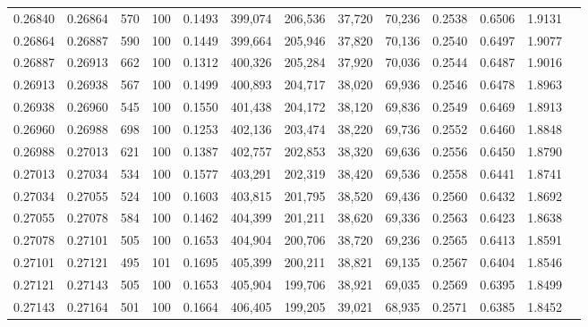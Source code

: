 \begin{tabular}{rrrrrrrrrrrrr}
0.26840 & 0.26864 &   570 & 100 &                                     0.1493 & 399,074 & 206,536 &  37,720 &  70,236 & 0.2538 & 0.6506 & 1.9131 \\
0.26864 & 0.26887 &   590 & 100 &                                     0.1449 & 399,664 & 205,946 &  37,820 &  70,136 & 0.2540 & 0.6497 & 1.9077 \\
0.26887 & 0.26913 &   662 & 100 &                                     0.1312 & 400,326 & 205,284 &  37,920 &  70,036 & 0.2544 & 0.6487 & 1.9016 \\
0.26913 & 0.26938 &   567 & 100 &                                     0.1499 & 400,893 & 204,717 &  38,020 &  69,936 & 0.2546 & 0.6478 & 1.8963 \\
0.26938 & 0.26960 &   545 & 100 &                                     0.1550 & 401,438 & 204,172 &  38,120 &  69,836 & 0.2549 & 0.6469 & 1.8913 \\
0.26960 & 0.26988 &   698 & 100 &                                     0.1253 & 402,136 & 203,474 &  38,220 &  69,736 & 0.2552 & 0.6460 & 1.8848 \\
0.26988 & 0.27013 &   621 & 100 &                                     0.1387 & 402,757 & 202,853 &  38,320 &  69,636 & 0.2556 & 0.6450 & 1.8790 \\
0.27013 & 0.27034 &   534 & 100 &                                     0.1577 & 403,291 & 202,319 &  38,420 &  69,536 & 0.2558 & 0.6441 & 1.8741 \\
0.27034 & 0.27055 &   524 & 100 &                                     0.1603 & 403,815 & 201,795 &  38,520 &  69,436 & 0.2560 & 0.6432 & 1.8692 \\
0.27055 & 0.27078 &   584 & 100 &                                     0.1462 & 404,399 & 201,211 &  38,620 &  69,336 & 0.2563 & 0.6423 & 1.8638 \\
0.27078 & 0.27101 &   505 & 100 &                                     0.1653 & 404,904 & 200,706 &  38,720 &  69,236 & 0.2565 & 0.6413 & 1.8591 \\
0.27101 & 0.27121 &   495 & 101 &                                     0.1695 & 405,399 & 200,211 &  38,821 &  69,135 & 0.2567 & 0.6404 & 1.8546 \\
0.27121 & 0.27143 &   505 & 100 &                                     0.1653 & 405,904 & 199,706 &  38,921 &  69,035 & 0.2569 & 0.6395 & 1.8499 \\
0.27143 & 0.27164 &   501 & 100 &                                     0.1664 & 406,405 & 199,205 &  39,021 &  68,935 & 0.2571 & 0.6385 & 1.8452 \\

\end{tabular}
